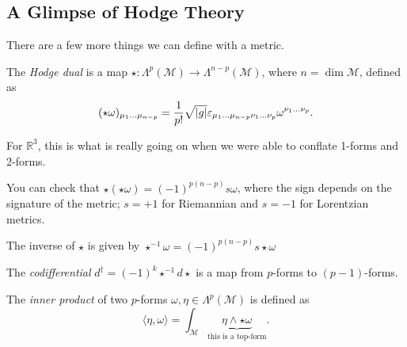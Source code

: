 
\subsection{A Glimpse of Hodge Theory}%
\label{sub:hodge_theory}

There are a few more things we can define with a metric.
\begin{definition}[]
  The \emph{Hodge dual} is a map $\star\colon \Lambda^p(\mathcal{M}) \to \Lambda^{n-p}(\mathcal{M})$, where $n = \dim \mathcal{M}$, defined as
  \begin{equation}
    (\star\omega)_{\mu_1 \dots \mu_{n-p}} = \frac{1}{p!} \sqrt{\abs{g}} \varepsilon_{\mu_1 \dots \mu_{n-p} \nu_1 \dots \nu_p} \omega^{\nu_1 \dots \nu_p}.
  \end{equation}
\end{definition}
\begin{leftbar}
  \begin{remark}
    For $\mathbb{R}^3$, this is what is really going on when we were able to conflate 1-forms and 2-forms.
  \end{remark}
\end{leftbar}
\begin{exercise}
  You can check that $\star(\star\omega) = (-1)^{p(n-p)} s\omega$, where the sign depends on the signature of the metric; $s = +1$ for Riemannian and $s = -1$ for Lorentzian metrics.
\end{exercise}
\begin{corollary}
  The inverse of $\star$ is given by $\star^{-1} \omega = (-1)^{p(n-p)} s \star \omega$
\end{corollary}
\begin{definition}[]
  The \emph{codifferential} $d^{\dagger} = (-1)^k \star^{-1} d \star {}$ is a map from $p$-forms to $(p-1)$-forms.
\end{definition}
\begin{definition}
  The \emph{inner product} of two $p$-forms $\omega, \eta \in \Lambda^p(\mathcal{M})$ is defined as
  \begin{equation}
    \langle \eta, \omega \rangle = \int_{\mathcal{M}} \underbrace{\eta \wedge \star\omega}_{\text{this is a top-form}}.
  \end{equation}
\end{definition}

